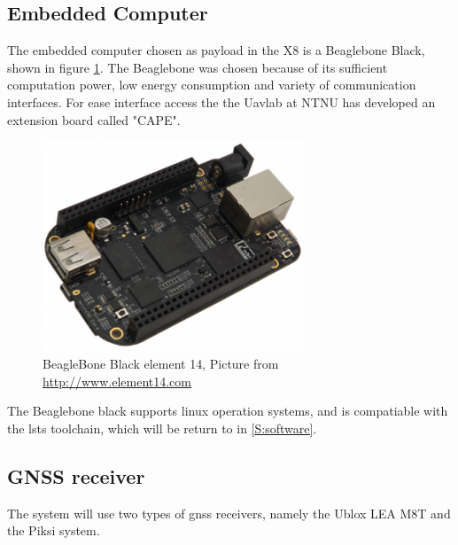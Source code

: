 \subsection{Embedded Computer}
The embedded computer chosen as payload in the X8 is a Beaglebone Black, shown in figure \ref{figure:BeagleBone}. The Beaglebone was chosen because of its sufficient computation power, low energy consumption and variety of communication interfaces. For ease interface access the  the Uavlab at NTNU has developed an extension board called "CAPE".
\begin{figure}[H]
	\centering
		\includegraphics[width=0.7\textwidth]{figs/BeagleBoneBlackE14.png}
		\caption{BeagleBone Black element 14, Picture from \url{http://www.element14.com}}
		\label{figure:BeagleBone}
\end{figure}
The Beaglebone black supports linux operation systems, and is compatiable with the \gls{lsts} toolchain, which will be return to in \ref{S:software}.
\subsection{GNSS receiver}
The system will use two types of \gls{gnss} receivers, namely the Ublox LEA M8T and the Piksi system. 
